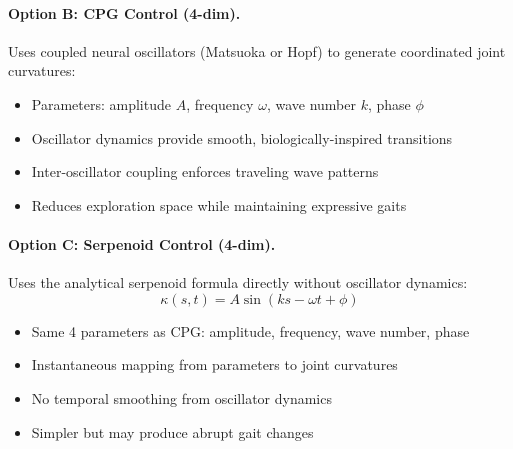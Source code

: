 \documentclass[11pt]{article}
\begin{document}
\paragraph{Option B: CPG Control (4-dim).}
Uses coupled neural oscillators (Matsuoka or Hopf) to generate coordinated joint curvatures:
\begin{itemize}
    \item Parameters: amplitude $A$, frequency $\omega$, wave number $k$, phase $\phi$
    \item Oscillator dynamics provide smooth, biologically-inspired transitions
    \item Inter-oscillator coupling enforces traveling wave patterns
    \item Reduces exploration space while maintaining expressive gaits
\end{itemize}

\paragraph{Option C: Serpenoid Control (4-dim).}
Uses the analytical serpenoid formula directly without oscillator dynamics:
\begin{equation}
    \kappa(s, t) = A \sin(ks - \omega t + \phi)
\end{equation}
\begin{itemize}
    \item Same 4 parameters as CPG: amplitude, frequency, wave number, phase
    \item Instantaneous mapping from parameters to joint curvatures
    \item No temporal smoothing from oscillator dynamics
    \item Simpler but may produce abrupt gait changes
\end{itemize}
\end{document}
